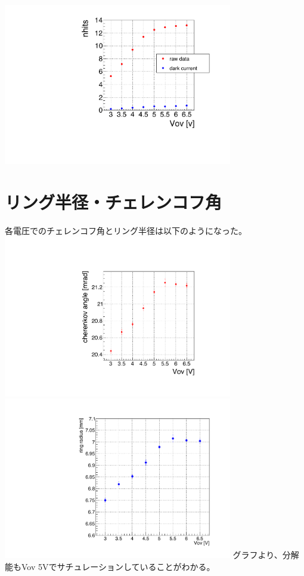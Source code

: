\documentclass[uplatex, titlepage, dvipdfmx, 12pt, a4paper]{jsreport}
\begin{document}
    \includegraphics[width=10cm, pagebox=cropbox, clip]{image/hit_count.pdf}

  \section{リング半径・チェレンコフ角}
    各電圧でのチェレンコフ角とリング半径は以下のようになった。
    \includegraphics[width=10cm, pagebox=cropbox, clip]{image/theta_allV.pdf}
    \includegraphics[width=10cm, pagebox=cropbox, clip]{image/all_radius.pdf}
    グラフより、分解能もVov 5Vでサチュレーションしていることがわかる。
\end{document}
